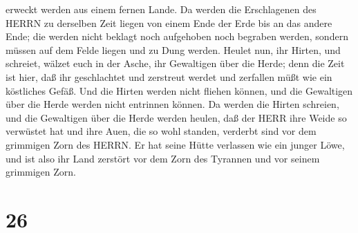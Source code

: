 erweckt werden aus einem fernen Lande.  Da werden die
Erschlagenen des HERRN zu derselben Zeit liegen von einem Ende der Erde
bis an das andere Ende; die werden nicht beklagt noch aufgehoben noch
begraben werden, sondern müssen auf dem Felde liegen und zu Dung werden.
 Heulet nun, ihr Hirten, und schreiet, wälzet euch in der
Asche, ihr Gewaltigen über die Herde; denn die Zeit ist hier, daß ihr
geschlachtet und zerstreut werdet und zerfallen müßt wie ein köstliches
Gefäß.  Und die Hirten werden nicht fliehen können, und die
Gewaltigen über die Herde werden nicht entrinnen können. 
Da werden die Hirten schreien, und die Gewaltigen über die Herde werden
heulen, daß der HERR ihre Weide so verwüstet hat  und ihre
Auen, die so wohl standen, verderbt sind vor dem grimmigen Zorn des
HERRN.  Er hat seine Hütte verlassen wie ein junger Löwe,
und ist also ihr Land zerstört vor dem Zorn des Tyrannen und vor seinem
grimmigen Zorn.

\hypertarget{section-25}{%
\section{26}\label{section-25}}

